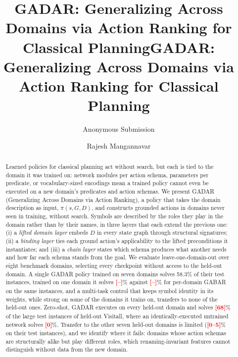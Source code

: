 \documentclass[letterpaper]{article} %
\title{GADAR: Generalizing Across Domains via Action Ranking for Classical Planning}
\author{
    Anonymous Submission
}
\title{GADAR: Generalizing Across Domains via Action Ranking for Classical Planning}
\author {
    Rajesh Mangannavar
}
\newcommand{\gadar}{GADAR}                 %
\newcommand{\todonum}[1]{\textcolor{red}{\textbf{[#1]}}}
\begin{document}
\maketitle

\begin{abstract}

Learned policies for classical planning act without search, but each is tied to the domain it was trained on: network modules per action schema, parameters per predicate, or vocabulary-sized encodings mean a trained policy cannot even be executed on a new domain's predicates and action schemas. We present \gadar{} (Generalizing Across Domains via Action Ranking), a policy that takes the domain description as input, $\pi(s, G, D)$, and constructs grounded actions in domains never seen in training, without search. Symbols are described by the roles they play in the domain rather than by their names, in three layers that each extend the previous one: (i) a \emph{lifted domain layer} embeds $D$ in every state graph through structural signatures; (ii) a \emph{binding layer} ties each ground action's applicability to the lifted preconditions it instantiates; and (iii) a \emph{chain layer} states which schema produces what another needs and how far each schema stands from the goal. We evaluate leave-one-domain-out over eight benchmark domains, selecting every checkpoint without access to the held-out domain. A single \gadar{} policy trained on seven domains solves 58.3\% of their test instances, trained on one domain it solves \todonum{--}\% against \todonum{--}\% for per-domain GABAR on the same instances, and a multi-task control that keeps symbol identity in its weights, while strong on some of the domains it trains on, transfers to none of the held-out ones. Zero-shot, \gadar{} executes on every held-out domain and solves \todonum{68}\% of the large test instances of held-out Visitall, where an identically-executed untrained network solves \todonum{0}\%. Transfer to the other seven held-out domains is limited (\todonum{0--5}\% on their test instances), and we identify where it fails: domains whose action schemas are structurally alike but play different roles, which renaming-invariant features cannot distinguish without data from the new domain.

\end{abstract}

\end{document}
